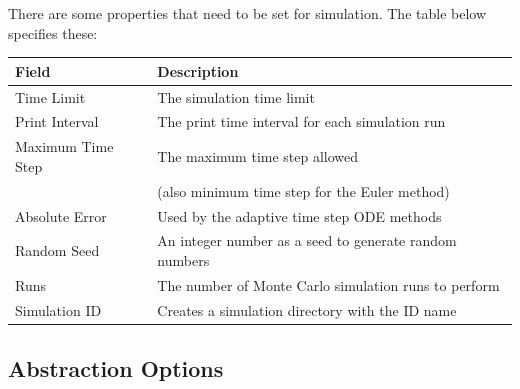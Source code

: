 \documentclass[titlepage,11pt]{article}
\begin{document}
There are some properties that need to be set for simulation.
The table below specifies these:

\begin{center}
\begin{tabular}{|l|l|}
\hline
Field             & Description \\ \hline \hline
Time Limit        & The simulation time limit \\ \hline
Print Interval    & The print time interval for each simulation run \\ \hline
Maximum Time Step & The maximum time step allowed \\ 
      ~           & (also minimum time step for the Euler method) \\ \hline
Absolute Error    & Used by the adaptive time step ODE methods \\ \hline
Random Seed       & An integer number as a seed to generate random
numbers \\ \hline
Runs              & The number of Monte Carlo simulation runs to
perform \\ \hline
Simulation ID     & Creates a simulation directory with the ID name \\ \hline
\end{tabular}
\end{center}

% 

\subsection{\label{absOptions}Abstraction Options}
\end{document}
